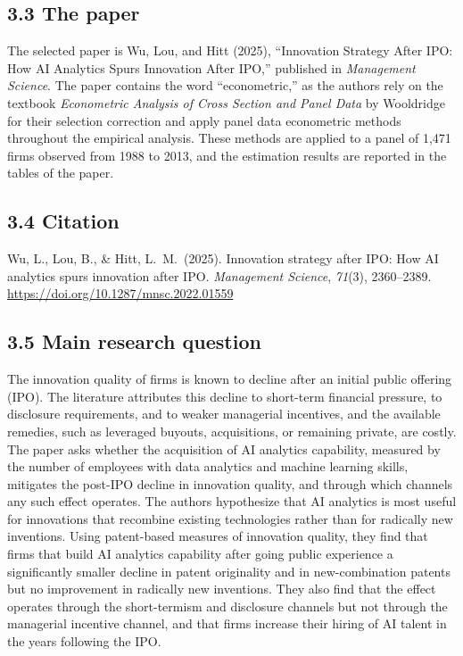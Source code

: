 \documentclass{HW} %
\begin{document}
\subsection*{3.3 The paper}
The selected paper is Wu, Lou, and Hitt (2025), ``Innovation Strategy After IPO: How AI Analytics Spurs Innovation After IPO,'' published in \emph{Management Science}. The paper contains the word ``econometric,'' as the authors rely on the textbook \emph{Econometric Analysis of Cross Section and Panel Data} by Wooldridge for their selection correction and apply panel data econometric methods throughout the empirical analysis. These methods are applied to a panel of 1{,}471 firms observed from 1988 to 2013, and the estimation results are reported in the tables of the paper.

\subsection*{3.4 Citation}
Wu, L., Lou, B., \& Hitt, L.\ M.\ (2025). Innovation strategy after IPO: How AI analytics spurs innovation after IPO. \emph{Management Science}, \emph{71}(3), 2360--2389. \url{https://doi.org/10.1287/mnsc.2022.01559}

\subsection*{3.5 Main research question}
The innovation quality of firms is known to decline after an initial public offering (IPO). The literature attributes this decline to short-term financial pressure, to disclosure requirements, and to weaker managerial incentives, and the available remedies, such as leveraged buyouts, acquisitions, or remaining private, are costly. The paper asks whether the acquisition of AI analytics capability, measured by the number of employees with data analytics and machine learning skills, mitigates the post-IPO decline in innovation quality, and through which channels any such effect operates. The authors hypothesize that AI analytics is most useful for innovations that recombine existing technologies rather than for radically new inventions. Using patent-based measures of innovation quality, they find that firms that build AI analytics capability after going public experience a significantly smaller decline in patent originality and in new-combination patents but no improvement in radically new inventions. They also find that the effect operates through the short-termism and disclosure channels but not through the managerial incentive channel, and that firms increase their hiring of AI talent in the years following the IPO.
\end{document}
